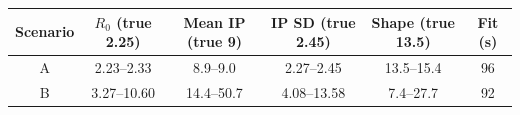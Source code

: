 \begin{tabular}{c c c c c c}
\toprule
Scenario & $R_0$ (true 2.25) & Mean IP (true 9) & IP SD (true 2.45) & Shape (true 13.5) & Fit (s) \\
\midrule
A & 2.23--2.33 & 8.9--9.0 & 2.27--2.45 & 13.5--15.4 & 96 \\
B & 3.27--10.60 & 14.4--50.7 & 4.08--13.58 & 7.4--27.7 & 92 \\
\bottomrule
\end{tabular}
